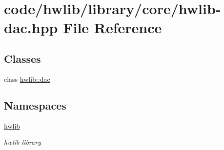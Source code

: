 \hypertarget{hwlib-dac_8hpp}{}\section{code/hwlib/library/core/hwlib-\/dac.hpp File Reference}
\label{hwlib-dac_8hpp}
\subsection*{Classes}
\begin{DoxyCompactItemize}
\item 
class \hyperlink{classhwlib_1_1dac}{hwlib\+::dac}
\end{DoxyCompactItemize}
\subsection*{Namespaces}
\begin{DoxyCompactItemize}
\item 
 \hyperlink{namespacehwlib}{hwlib}
\begin{DoxyCompactList}\small\item\em hwlib library \end{DoxyCompactList}\end{DoxyCompactItemize}
